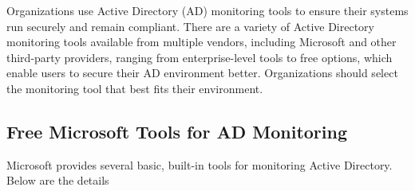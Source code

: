 Organizations use Active Directory (AD) monitoring tools to ensure their systems run securely and remain compliant. There are a variety of Active Directory monitoring tools available from multiple vendors, including Microsoft and other third-party providers, ranging from enterprise-level tools to free options, which enable users to secure their AD environment better. Organizations should select the monitoring tool that best fits their environment.

\subsection{\textbf{Free Microsoft Tools for AD Monitoring}}

Microsoft provides several basic, built-in tools for monitoring Active Directory. Below are the details

